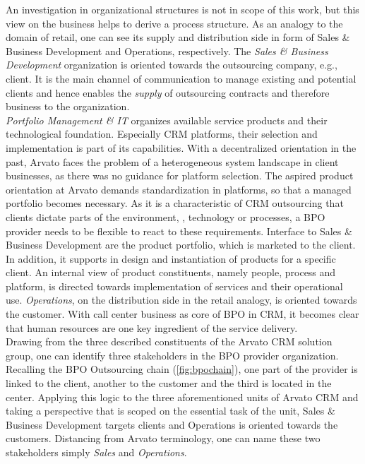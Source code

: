 An investigation in organizational structures is not in scope of this work, but this view on the business helps to derive a process structure. As an analogy to the domain of retail, one can see its supply and distribution side in form of Sales \& Business Development and Operations, respectively. The \textit{Sales \& Business Development }organization is oriented towards the outsourcing company, e.g., client. It is the main channel of communication to manage existing and potential clients and hence enables the \textit{supply} of outsourcing contracts and therefore business to the organization.\\
 \textit{Portfolio Management \& IT} organizes available service products and their technological foundation. Especially CRM platforms, their selection and implementation is part of its capabilities. With a decentralized orientation in the past, Arvato faces the problem of a heterogeneous system landscape in client businesses, as there was no guidance for platform selection. The aspired product orientation at Arvato demands standardization in platforms, so that a managed portfolio becomes necessary. As it is a characteristic of CRM outsourcing that clients dictate parts of the environment, \eg, technology or processes, a BPO provider needs to be flexible to react to these requirements. Interface to Sales \& Business Development are the product portfolio, which is marketed to the client. In addition, it supports in design and instantiation of products for a specific client. An internal view of product constituents, namely people, process and platform, is directed towards implementation of services and their operational use. 
  \textit{Operations}, on the distribution side in the retail analogy, is oriented towards the customer. With call center business as core of BPO in CRM, it becomes clear that human resources are one key ingredient of the service delivery.  \\
  
  Drawing from the three described constituents of the Arvato CRM solution group, one can identify three stakeholders in the BPO provider organization. Recalling the BPO Outsourcing chain (\Fig \ref{fig:bpochain}), one part of the provider is linked to the client, another to the customer and the third is located in the center. Applying this logic to the three aforementioned units of Arvato CRM and taking a perspective that is scoped on the essential task of the unit, Sales \& Business Development targets clients and Operations is oriented towards the customers. Distancing from Arvato terminology, one can name these two stakeholders simply \textit{Sales} and \textit{Operations}. \\
  
